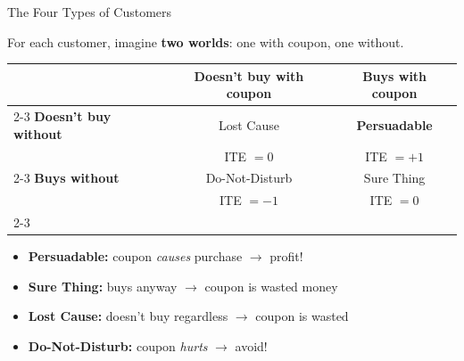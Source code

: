 \documentclass[aspectratio=169, 11pt, handout]{beamer}
\begin{document}
\begin{frame}{The Four Types of Customers}

For each customer, imagine \textbf{two worlds}: one with coupon, one without.

\bigskip

\begin{center}
\begin{tabular}{l|c|c|}
\multicolumn{1}{c}{} & \multicolumn{1}{c}{\textbf{Doesn't buy with coupon}} & \multicolumn{1}{c}{\textbf{Buys with coupon}} \\
\cline{2-3}
\textbf{Doesn't buy without} & \cellcolor{gray!15} Lost Cause & \cellcolor{green!15} \textbf{Persuadable} \\
& ITE $= 0$ & ITE $= +1$ \\
\cline{2-3}
\textbf{Buys without} & \cellcolor{red!15} Do-Not-Disturb & \cellcolor{blue!10} Sure Thing \\
& ITE $= -1$ & ITE $= 0$ \\
\cline{2-3}
\end{tabular}
\end{center}

\bigskip
\pause

\begin{itemize}
    \item \textbf{Persuadable:} coupon \emph{causes} purchase $\longrightarrow$ profit!
    \item \textbf{Sure Thing:} buys anyway $\longrightarrow$ coupon is wasted money
    \item \textbf{Lost Cause:} doesn't buy regardless $\longrightarrow$ coupon is wasted
    \item \textbf{Do-Not-Disturb:} coupon \emph{hurts} $\longrightarrow$ avoid!
\end{itemize}
\end{frame}
\end{document}
